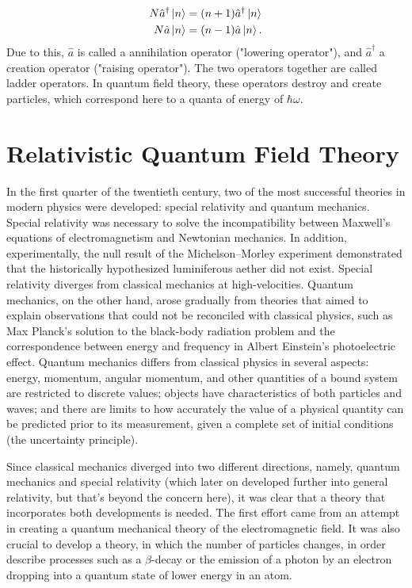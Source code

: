 \begin{equation}
\begin{split}
N\hat{a}^\dagger \ket{n} &= (n+1)\hat{a}^\dagger\ket{n} \\
N\hat{a}\ket{n} &= (n-1)\hat{a}\ket{n}.
\end{split}
\end{equation}
Due to this, $\hat{a}$ is called a annihilation operator ("lowering operator"), and $\hat{a}^\dagger$ a creation operator ("raising operator"). The two operators together are called ladder operators. In quantum field theory, these operators destroy and create particles, which correspond here to a quanta of energy of $\hbar\omega$.

\section{Relativistic Quantum Field Theory}

In the first quarter of the twentieth century, two of the most successful theories in modern physics were developed: special relativity and quantum mechanics. Special relativity was necessary to solve the incompatibility between Maxwell's equations of electromagnetism and Newtonian mechanics. In addition, experimentally, the null result of the Michelson–Morley experiment demonstrated that the historically hypothesized luminiferous aether did not exist. Special relativity diverges from classical mechanics at high-velocities. Quantum mechanics, on the other hand, arose gradually from theories that aimed to explain observations that could not be reconciled with classical physics, such as Max Planck's solution to the black-body radiation problem and the correspondence between energy and frequency in Albert Einstein's photoelectric effect. Quantum mechanics differs from classical physics in several aspects: energy, momentum, angular momentum, and other quantities of a bound system are restricted to discrete values; objects have characteristics of both particles and waves; and there are limits to how accurately the value of a physical quantity can be predicted prior to its measurement, given a complete set of initial conditions (the uncertainty principle).

Since classical mechanics diverged into two different directions, namely, quantum mechanics and special relativity (which later on developed further into general relativity, but that's beyond the concern here), it was clear that a theory that incorporates both developments is needed. The first effort came from an attempt in creating a quantum mechanical theory of the electromagnetic field. It was also crucial to develop a theory, in which the number of particles changes, in order describe processes such as a $\beta$-decay or the emission of a photon by an electron dropping into a quantum state of lower energy in an atom.

